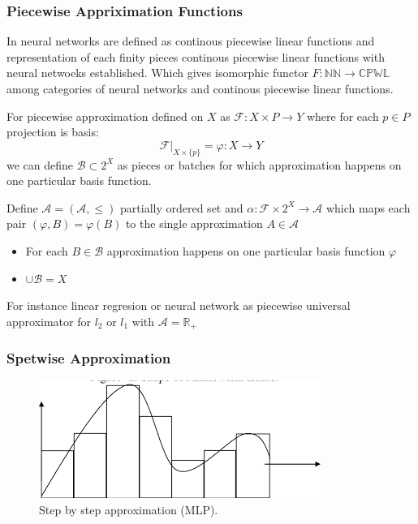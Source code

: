 \documentclass{beamer}
\newcommand {\FF}                         {\mathcal{F}}
\newcommand {\A}                          {\mathcal{A}}
\newcommand {\B}                          {\mathcal{B}}
\newcommand {\f}                          {\varphi}
\begin{document}
\begin{frame}
    \frametitle{Piecewise Appriximation Functions}
    In \cite{NNCPWLRepr} neural networks are defined as 
    continous piecewise linear functions and representation of each finity pieces 
    continous piecewise linear functions with neural netwoeks established. Which gives 
    isomorphic functor $F : \mathbb{NN} \to \mathbb{CPWL}$ among categories of neural networks 
    and continous piecewise linear functions.

    For piecewise approximation defined on $X$ as 
    $\FF :X \times P \to Y$ where for each $p \in P$ projection is basis:
    $$\left.\FF\right|_{X \times \{p\}} = \f : X \to Y$$
    we can define $\B \subset 2^X$ as 
    pieces or batches for which approximation happens on one particular basis function.
    
    Define $\A = (\A, \le)$ partially ordered set and  $\alpha : \FF \times 2^{X} \to \A$ 
    which maps each pair $(\f, B) = \f(B)$ to the single approximation $A \in \A$
    \begin{itemize}
        \item For each $B \in \B$ approximation happens on one particular basis function $\f$
        \item $\cup {\B} = X$
    \end{itemize}
    For instance linear regresion or neural network as piecewise universal approximator
    for $l_2$ or $l_1$ with $\A = \mathbb{R}_+$
\end{frame}

\begin{frame}
    \frametitle{Spetwise Approximation}
    \begin{figure}
        \includegraphics[width=\linewidth]{step_approx_1.png}
        \caption{Step by step approximation (MLP).}
        \label{fig:stepapp}
    \end{figure}
\end{frame}
\end{document}
